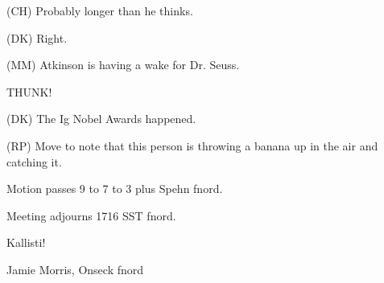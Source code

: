 (CH) Probably longer than he thinks.

(DK) Right.

(MM) Atkinson is having a wake for Dr. Seuss.

THUNK!

(DK) The Ig Nobel Awards happened.

(RP) Move to note that this person is throwing a banana up in the
air and catching it.

Motion passes 9 to 7 to 3 plus Spehn fnord.

Meeting adjourns 1716 SST fnord.

\vspace{0.15in}
\begin{center}
Kallisti!

Jamie Morris, Onseck fnord
\end{center}

